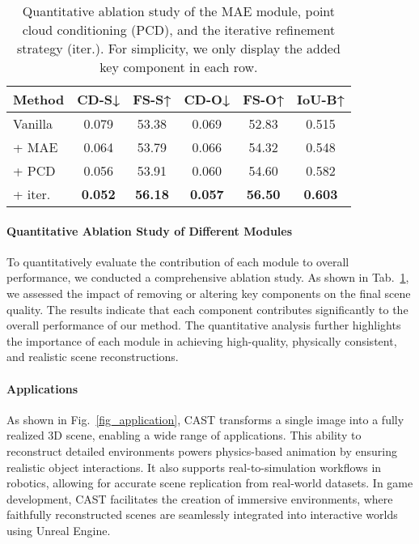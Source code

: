 \begin{table}[]
\centering
\caption{Quantitative ablation study of the MAE module, point cloud conditioning (PCD), and the iterative refinement strategy (iter.). For simplicity, we only display the added key component in each row.}
\label{tab:ablation_occ_iter}
\begin{tabular}{lccccc}
\toprule
\textbf{Method} & CD-S↓ & FS-S↑ & CD-O↓ & FS-O↑ & IoU-B↑ \\
\midrule
Vanilla & 0.079 & 53.38 & 0.069 & 52.83 & 0.515\\
+ MAE  & 0.064 & 53.79& 0.066 &  54.32& 0.548\\
+ PCD   & 0.056 & 53.91 & 0.060 & 54.60  & 0.582 \\
+ iter.     & \textbf{0.052} &  \textbf{56.18}  & \textbf{0.057} & \textbf{56.50} & \textbf{0.603} \\

\bottomrule
\end{tabular}
\end{table}



\paragraph{Quantitative Ablation Study of Different Modules}
To quantitatively evaluate the contribution of each module to overall performance, we conducted a comprehensive ablation study. As shown in Tab.~\ref{tab:ablation_occ_iter}, we assessed the impact of removing or altering key components on the final scene quality. The results indicate that each component contributes significantly to the overall performance of our method. The quantitative analysis further highlights the importance of each module in achieving high-quality, physically consistent, and realistic scene reconstructions.

\paragraph{Applications}
As shown in Fig.~\ref{fig_application}, CAST transforms a single image into a fully realized 3D scene, enabling a wide range of applications. This ability to reconstruct detailed environments powers physics-based animation by ensuring realistic object interactions. It also supports real-to-simulation workflows in robotics, allowing for accurate scene replication from real-world datasets. In game development, CAST facilitates the creation of immersive environments, where faithfully reconstructed scenes are seamlessly integrated into interactive worlds using Unreal Engine.

